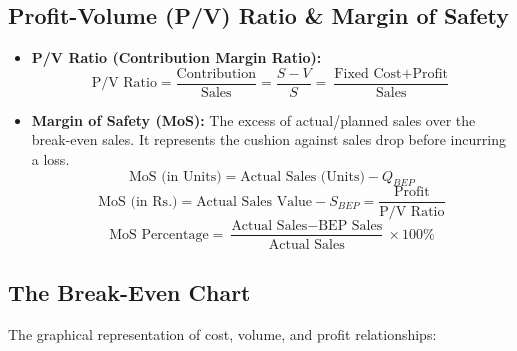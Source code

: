 \documentclass[12pt,a4paper]{article}
\begin{document}
\subsection{Profit-Volume (P/V) Ratio \& Margin of Safety}
\begin{tcolorbox}[formulabox, title={P/V Ratio and Margin of Safety Formulas}]
\begin{itemize}[leftmargin=*, itemsep=3.5pt, topsep=0pt]
  \item \textbf{P/V Ratio (Contribution Margin Ratio):}
    \begin{equation}
      \text{P/V Ratio} = \frac{\text{Contribution}}{\text{Sales}} = \frac{S - V}{S} = \frac{\text{Fixed Cost} + \text{Profit}}{\text{Sales}}
    \end{equation}
  \item \textbf{Margin of Safety (MoS):} The excess of actual/planned sales over the break-even sales. It represents the cushion against sales drop before incurring a loss.
    \begin{equation}
      \text{MoS (in Units)} = \text{Actual Sales (Units)} - Q_{BEP}
    \end{equation}
    \begin{equation}
      \text{MoS (in Rs.)} = \text{Actual Sales Value} - S_{BEP} = \frac{\text{Profit}}{\text{P/V Ratio}}
    \end{equation}
    \begin{equation}
      \text{MoS Percentage} = \frac{\text{Actual Sales} - \text{BEP Sales}}{\text{Actual Sales}} \times 100\%
    \end{equation}
\end{itemize}
\end{tcolorbox}

\subsection{The Break-Even Chart}
The graphical representation of cost, volume, and profit relationships:
\end{document}
